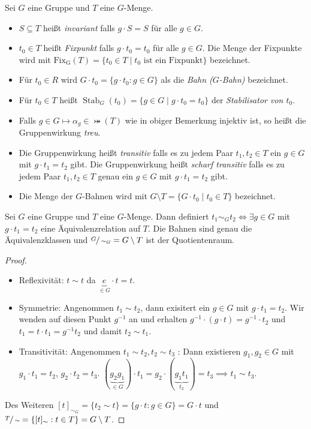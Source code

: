 \begin{definition}
	Sei $G$ eine Gruppe und $T$ eine $G$-Menge.
	\begin{itemize}
		\item $S \subseteq T$ heißt \emph{invariant} falls $g \cdot S = S$ für alle $g \in G$.
		\item $t_0 \in T$ heißt \emph{Fixpunkt} falls $g \cdot t_0 = t_0$ für alle $g \in G$.
			Die Menge der Fixpunkte wird mit $\operatorname{Fix_{G}}(T) = \{t_0 \in T \mid t_0 \text{ ist ein Fixpunkt}\} $ bezeichnet.
		\item Für $t_0 \in R$ wird $G \cdot t_0 = \{g \cdot t_0 : g \in G\}$ als die \emph{Bahn ($G$-Bahn)} bezeichnet.
		\item Für $t_0 \in T$ heißt $\operatorname{Stab}_{G}(t_0) = \{g \in G \mid g \cdot t_0 = t_0\}$ der \emph{Stabilisator von $t_0$}.
		\item Falls $g \in G \mapsto \alpha_{g} \in \bij(T)$ wie in obiger Bemerkung injektiv ist, so heißt die Gruppenwirkung \emph{treu}.
		\item Die Gruppenwirkung heißt \emph{transitiv} falls es zu jedem Paar $t_1,t_2 \in T$ ein $g \in G$ mit $g \cdot  t_1 = t_2$ gibt.
			Die Gruppenwirkung heißt \emph{scharf transitiv} falls es zu jedem Paar $t_1,t_2 \in T$ genau ein $g \in G$ mit $g \cdot t_1 = t_2$ gibt.
		\item Die Menge der $G$-Bahnen wird mit $G \setminus T = \{G \cdot t_0 \mid t_0 \in T\} $ bezeichnet.
	\end{itemize}
\end{definition}


\begin{lemma}
	Sei $G$ eine Gruppe und $T$ eine $G$-Menge.
	Dann definiert $t_1 \sim_{G} t_2 \Leftrightarrow \exists g \in G$ mit $g \cdot t_1 = t_2$ eine Äquivalenzrelation auf $T$. Die Bahnen sind genau die Äquivalenzklassen
	und $\sfrac{G}{\sim_{G}} = G \setminus T$ ist der Quotientenraum.
\end{lemma}

\begin{proof}
	\begin{itemize}
		\item Reflexivität: $t \sim t$ da $\underbrace{e}_{\in G} \cdot  t = t$.
		\item Symmetrie: Angenommen $t_1 \sim t_2$, dann exisitert ein $g \in G$ mit $g \cdot t_1 = t_2$.
			Wir wenden auf diesen Punkt $g^{-1}$ an und erhalten $g^{-1} \cdot (g \cdot t) = g^{-1} \cdot t_2$ und
			$t_1 = t \cdot t_1 = g^{-1} t_2$ und damit $t_2 \sim t_1$.
		\item Transitivität: Angenommen $t_1 \sim t_2, t_2 \sim t_3$ : Dann existieren $g_1, g_2 \in G$ mit $g_1 \cdot t_1 = t_2$, $g_2 \cdot t_2 = t_3$.
			$(\underbrace{g_2 g_1}_{\in G}) \cdot t_1 = g_2 \cdot (\underbrace{g_1 t_1}_{t_2}) = t_3 \implies t_1 \sim t_3$.
	\end{itemize}
	Des Weiteren $[ t ]_{\sim_{G}} = \{t_2 \sim t\} = \{g \cdot t : g \in G\} = G \cdot t$ und $\sfrac{T}{\sim} = \{[ t ]_{\sim} : t \in T\} = G \setminus T$.
\end{proof}

